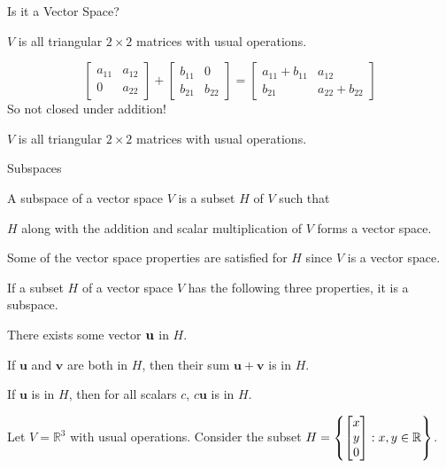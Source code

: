 \documentclass[xcolor=dvipsnames,aspectratio=169,t]{beamer}
\begin{document}
\begin{frame}{Is it a Vector Space?}
\bigskip

$V$ is all triangular $2 \times 2$ matrices with usual operations.

\pause
 \[ \begin{bmatrix} a_{11} & a_{12} \\ 0 & a_{22} \end{bmatrix} + \begin{bmatrix} b_{11} & 0 \\ b_{21} & b_{22} \end{bmatrix}  = \begin{bmatrix} a_{11}+b_{11} & a_{12} \\ b_{21} & a_{22}+b_{22} \end{bmatrix} \]
 \qquad So \alert{not} closed under addition!


\vspace{0.5in}

\pause
$V$ is all  triangular $2 \times 2$ matrices with usual operations. \quad 
\pause{}

\end{frame}


\begin{frame}{Subspaces}

\begin{definition}
  A \alert{subspace} of a vector space $V$ is a subset $H$ of $V$ such that 
  
  \quad $H$ along with the addition and scalar multiplication of $V$ forms a vector space.
\end{definition}

\pause
Some of the vector space properties are satisfied for $H$ since $V$ is a vector space.

  {\small
  \bbox
  If a subset $H$ of a vector space $V$ has the following three properties, it is a \alert{subspace}.
  \bb
    \item {} There exists some vector $\mathbf{u}$ in $H$.
    \item {} If $\mathbf{u}$ and $\mathbf{v}$ are both in $H$, then their sum $\mathbf{u} + \mathbf{v}$ is in $H$.
    \item {} If $\mathbf{u}$ is in $H$, then for all scalars $c$, $c\mathbf{u}$ is in $H$.
  \ee
  \ebox
  }

Let $V = \mathbb{R}^3$ with usual operations. Consider the subset $\displaystyle H = \left\{ \begin{bmatrix} x \\ y \\ 0 \end{bmatrix} : x, y \in \mathbb{R}  \right\}$.

\end{frame}
\end{document}
